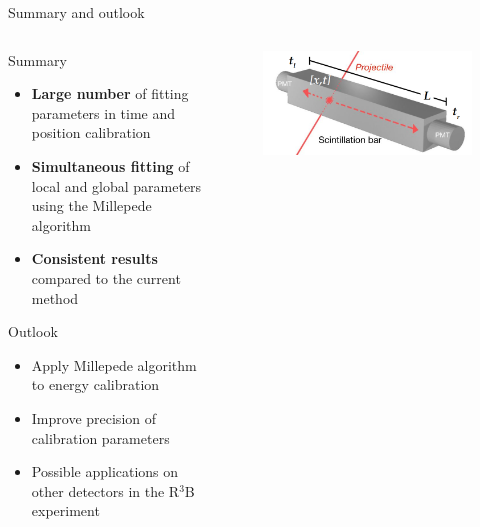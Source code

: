 \documentclass[compress, 13pt, aspectratio=169]{beamer}
\begin{document}
\begin{frame}[t]{Summary and outlook}
	\vspace*{-2em}

	\begin{columns}[t]
		\begin{column}[t]{0.45\textwidth}
			\begin{alertblock}{\small Summary}
				\small
				\begin{itemize}
					\setlength\itemsep{0em}
					\item \textbf{Large number} of fitting parameters in time and position calibration
					\item \textbf{Simultaneous fitting} of local and global parameters using the Millepede algorithm
					\item \textbf{Consistent results} compared to the current method
				\end{itemize}
			\end{alertblock}
			\begin{block}{\small Outlook}
				\small
				\begin{itemize}
					\setlength\itemsep{0em}
					\item Apply Millepede algorithm to energy calibration
					\item Improve precision of calibration parameters
					\item Possible applications on other detectors in the R$^3$B experiment
				\end{itemize}
			\end{block}
		\end{column}
		\begin{column}[t]{0.45\textwidth}
			\begin{figure}[t]
				\hspace*{-0.5cm}
				\centering
				\includegraphics[keepaspectratio, height = 0.3\textheight]{Bar.png}
			\end{figure}

\end{column}
\end{columns}
\end{frame}
\end{document}
